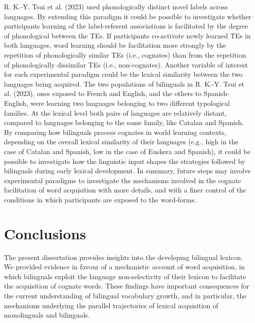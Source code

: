 \documentclass[
  12pt,
  b5paperpaper,
  twoside]{scrreprt}
\begin{document}
R. K.-Y. Tsui et al. (2023) used phonologically distinct novel labels
across languages. By extending this paradigm it could be possible to
investigate whether participants learning of the label-referent
associations is facilitated by the degree of phonological between the
TEs. If participants co-activate newly learned TEs in both languages,
word learning should be facilitation more strongly by the repetition of
phonologically similar TEs (i.e., cognates) than from the repetition of
phonologically dissimilar TEs (i.e., non-cognates). Another variable of
interest for such experimental paradigm could be the lexical similarity
between the two languages being acquired. The two populations of
bilinguals in R. K.-Y. Tsui et al. (2023), ones exposed to French and
English, and the others to Spanish-English, were learning two languages
belonging to two different typological families. At the lexical level
both pairs of languages are relatively distant, compared to languages
belonging to the same family, like Catalan and Spanish. By comparing how
bilinguals process cognates in world learning contexts, depending on the
overall lexical similarity of their languages (e.g., high in the case of
Catalan and Spanish, low in the case of Euskera and Spanish), it could
be possible to investigate how the linguistic input shapes the
strategies followed by bilinguals during early lexical development. In
summary, future steps may involve experimental paradigms to investigate
the mechanisms involved in the cognate facilitation of word acquisition
with more details, and with a finer control of the conditions in which
participants are exposed to the word-forms.

\hypertarget{conclusions}{%
\section{Conclusions}\label{conclusions}}

The present dissertation provides insights into the developing bilingual
lexicon. We provided evidence in favour of a mechanistic account of word
acquisition, in which bilinguals exploit the language non-selectivity of
their lexicon to facilitate the acquisition of cognate words. These
findings have important consequences for the current understanding of
bilingual vocabulary growth, and in particular, the mechanisms
underlying the parallel trajectories of lexical acquisition of
monolinguals and bilinguals.

\clearpage

\end{document}
